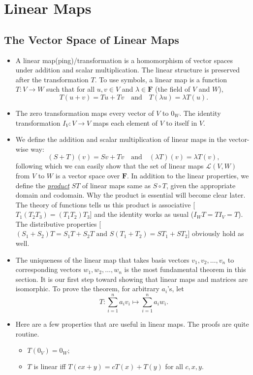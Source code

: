 \documentclass{article}
\newcommand{\df}[1]{\ul{\textit{#1}}}
\newcommand{\F}{\mathbf{F}}
\begin{document}
\newpage
\section{Linear Maps}
\subsection{The Vector Space of Linear Maps}
\begin{itemize}
    \item A linear map(ping)/transformation is a homomorphism of vector spaces under addition and scalar multiplication. The linear structure is preserved after the transformation $T$. To use symbols, a linear map is a function $T: V \rightarrow W$ such that for all $u,v \in V$ and $\lambda \in \F$ (the field of $V$ and $W$),
    \begin{equation*}
        T(u+v) = Tu + Tv \quad \text{and} \quad
        T (\lambda u) = \lambda T(u).
    \end{equation*}
    \item The zero transformation maps every vector of $V$ to $0_W$. The identity transformation $I_V: V \rightarrow V$ maps each element of $V$ to itself in $V$.
    \item We define the addition and scalar multiplication of linear maps in the vector-wise way: $$(S+T)(v) = Sv + Tv \quad \text{and} \quad (\lambda T)(v) = \lambda T(v),$$ following which we can easily show that the set of linear maps $\mathcal{L}(V,W)$ from $V$ to $W$ is a vector space over $\F$. In addition to the linear properties, we define the \df{product} $ST$ of linear maps same as $S \circ T$, given the appropriate domain and codomain. Why the product is essential will become clear later. The theory of functions tells us this product is associative [$T_1(T_2 T_3) = (T_1 T_2) T_3$] and the identity works as usual ($I_W T = T I_V = T$). The distributive properties [$(S_1 + S_2) T = S_1 T + S_2 T \text{ and } S(T_1 + T_2) = S T_1 + S T_2$] obviously hold as well.
    \item The uniqueness of the linear map that takes basis vectors $v_1, v_2, \dots, v_n$ to corresponding vectors $w_1, w_2, \dots, w_n$ is the most fundamental theorem in this section. It is our first step toward showing that linear maps and matrices are isomorphic. To prove the theorem, for arbitrary $a_i$'s, let $$T: \sum_{i=1}^n a_i v_i \mapsto \sum_{i=1}^n a_i w_i.$$
    \item Here are a few properties that are useful in linear maps. The proofs are quite routine.
    \begin{itemize}
        \item $T(0_V) = 0_W;$
        \item $T$ is linear iff $T(cx+y) = cT(x) + T(y)$ for all $c,x,y.$
    \end{itemize}
\end{itemize}
\end{document}
